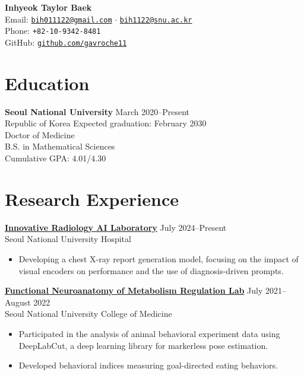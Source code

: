 \documentclass[10pt, a4paper]{article}
\newenvironment{customitemize}
	{\begin{itemize}[leftmargin=*, noitemsep, topsep=0pt, label=$\cdot$]}
	{\end{itemize}}
\begin{document}
\begin{center}
    {\Large\textbf{Inhyeok Taylor Baek}} \\
    \vspace{0.5mm}
    Email: \href{mailto:bih011122@gmail.com}{\texttt{bih011122@gmail.com}} $\cdot$ \href{mailto:bih1122@snu.ac.kr}{\texttt{bih1122@snu.ac.kr}} \\
    Phone: \texttt{+82-10-9342-8481} \\
    GitHub: \href{https://github.com/gavroche11}{\texttt{github.com/gavroche11}}
\end{center}

\section*{Education}
\textbf{Seoul National University} \hfill March 2020--Present \\
Republic of Korea \hfill {Expected graduation: February 2030}\smallskip \\
Doctor of Medicine\\
B.S. in Mathematical Sciences \smallskip\\
Cumulative GPA: 4.01/4.30

\section*{Research Experience}
\href{http://irail.snu.ac.kr}{\textbf{Innovative Radiology AI Laboratory}} \hfill July 2024--Present\\
Seoul National University Hospital \smallskip
\begin{customitemize}
    \item Developing a chest X-ray report generation model, focusing on the impact of visual encoders on performance and the use of diagnosis-driven prompts.
\end{customitemize}
\bigskip
\href{https://fnmr.snu.ac.kr/}{\textbf{Functional Neuroanatomy of Metabolism Regulation Lab}} \hfill July 2021--August 2022\\
Seoul National University College of Medicine \smallskip
\begin{customitemize}
    \item Participated in the analysis of animal behavioral experiment data using DeepLabCut, a deep learning library for markerless pose estimation.
    \item Developed behavioral indices measuring goal-directed eating behaviors.
\end{customitemize}
\end{document}
